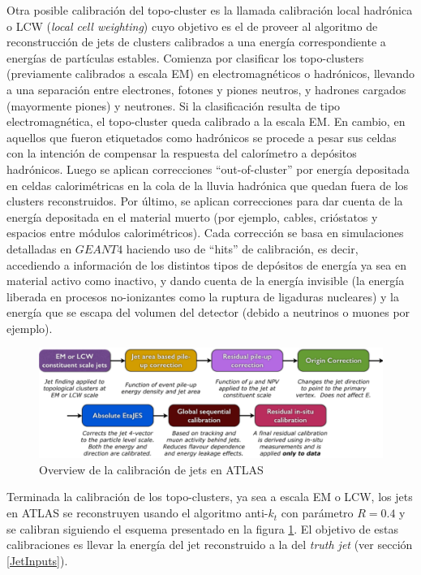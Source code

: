 Otra posible calibración del topo-cluster es la llamada calibración local hadrónica o LCW (\textit{local cell weighting}) cuyo objetivo es el de proveer al algoritmo de reconstrucción de jets de clusters calibrados a una energía correspondiente a energías de partículas estables. Comienza por clasificar los topo-clusters (previamente calibrados a escala EM) en electromagnéticos o hadrónicos, llevando a una separación entre electrones, fotones y piones neutros, y hadrones cargados (mayormente piones) y neutrones. Si la clasificación resulta de tipo electromagnética, el topo-cluster queda calibrado a la escala EM. En cambio, en aquellos que fueron etiquetados como hadrónicos se procede a pesar sus celdas con la intención de compensar la respuesta del calorímetro a depósitos hadrónicos. Luego se aplican correcciones ``out-of-cluster'' por energía depositada en celdas calorimétricas en la cola de la lluvia hadrónica que quedan fuera de los clusters reconstruidos. Por último, se aplican correcciones para dar cuenta de la energía depositada en el material muerto (por ejemplo, cables, crióstatos y espacios entre módulos calorimétricos). Cada corrección se basa en simulaciones detalladas en $GEANT4$ haciendo uso de ``hits'' de calibración, es decir, accediendo a información de los distintos tipos de depósitos de energía ya sea en material activo como inactivo, y dando cuenta de la energía invisible (la energía liberada en procesos no-ionizantes como la ruptura de ligaduras nucleares) y la energía que se escapa del volumen del detector (debido a neutrinos o muones por ejemplo)\cite{LocalHadronic}.\\

\begin{figure}[h]
    \centering
    \includegraphics[width =\linewidth]{images/JES}
    \caption{ Overview de la calibración de jets en ATLAS \cite{JESpaper} }
    \label{fig:JES}
\end{figure}

Terminada la calibración de los topo-clusters, ya sea a escala EM o LCW, los jets en ATLAS se reconstruyen usando el algoritmo anti-$k_t$ con parámetro $R=0.4$
y se calibran siguiendo el esquema presentado en la figura \ref{fig:JES}\cite{JESpaper}. El objetivo de estas calibraciones es llevar la energía del jet reconstruido a la del \textit{truth jet} (ver sección \ref{JetInputs}).

